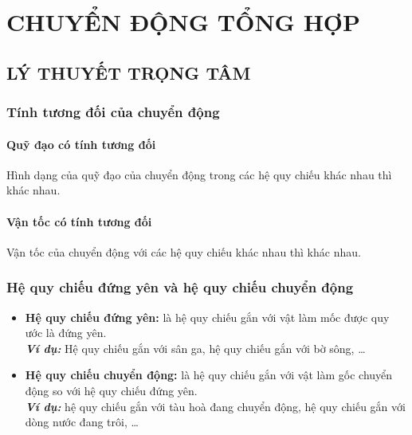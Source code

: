 \section{CHUYỂN ĐỘNG TỔNG HỢP}
\subsection{LÝ THUYẾT TRỌNG TÂM}
\begin{tomtat}
	\subsubsection{Tính tương đối của chuyển động}
	\paragraph{Quỹ đạo có tính tương đối}
		Hình dạng của quỹ đạo của chuyển động trong các hệ quy chiếu khác nhau thì khác nhau.
	\paragraph{Vận tốc có tính tương đối}
	Vận tốc của chuyển động với các hệ quy chiếu khác nhau thì khác nhau. 
	\subsubsection{Hệ quy chiếu đứng yên và hệ quy chiếu chuyển động}
	\begin{dn}
		\begin{itemize}
			\item \textbf{Hệ quy chiếu đứng yên:} là hệ quy chiếu gắn với vật làm mốc được quy ước là đứng yên.\\
			\textit{\textbf{Ví dụ:}} Hệ quy chiếu gắn với sân ga, hệ quy chiếu gắn với bờ sông, \dots
			\item \textbf{Hệ quy chiếu chuyển động:} là hệ quy chiếu gắn với vật làm gốc chuyển động so với hệ quy chiếu đứng yên.\\
			\textit{\textbf{Ví dụ:}} hệ quy chiếu gắn với tàu hoà đang chuyển động, hệ quy chiếu gắn với dòng nước đang trôi, \dots
		\end{itemize}
	\end{dn}

\end{tomtat}
